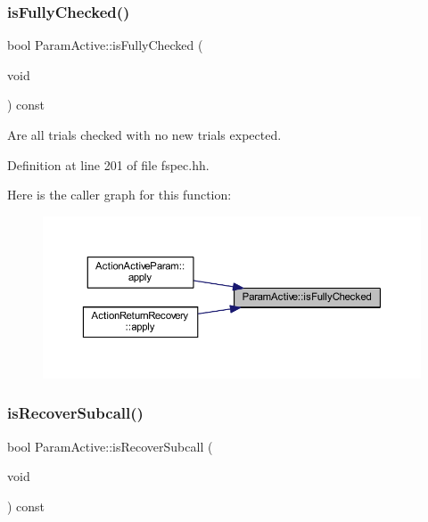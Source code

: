 \subsubsection{\texorpdfstring{isFullyChecked()}{isFullyChecked()}}
{\footnotesize\ttfamily bool Param\+Active\+::is\+Fully\+Checked (\begin{DoxyParamCaption}\item[{void}]{ }\end{DoxyParamCaption}) const\hspace{0.3cm}{\ttfamily [inline]}}



Are all trials checked with no new trials expected. 



Definition at line 201 of file fspec.\+hh.

Here is the caller graph for this function\+:
\nopagebreak
\begin{figure}[H]
\begin{center}
\leavevmode
\includegraphics[width=350pt]{class_param_active_a77a0cc16f6a28aeb1fae38416ed2c3ed_icgraph}
\end{center}
\end{figure}
\mbox{\label{class_param_active_a3335a98aec79bc7b683f6edc0e954c96}} 
\subsubsection{\texorpdfstring{isRecoverSubcall()}{isRecoverSubcall()}}
{\footnotesize\ttfamily bool Param\+Active\+::is\+Recover\+Subcall (\begin{DoxyParamCaption}\item[{void}]{ }\end{DoxyParamCaption}) const\hspace{0.3cm}{\ttfamily [inline]}}



